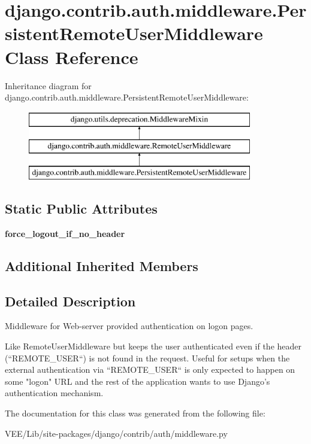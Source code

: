 \hypertarget{classdjango_1_1contrib_1_1auth_1_1middleware_1_1_persistent_remote_user_middleware}{}\section{django.\+contrib.\+auth.\+middleware.\+Persistent\+Remote\+User\+Middleware Class Reference}
\label{classdjango_1_1contrib_1_1auth_1_1middleware_1_1_persistent_remote_user_middleware}
Inheritance diagram for django.\+contrib.\+auth.\+middleware.\+Persistent\+Remote\+User\+Middleware\+:\begin{figure}[H]
\begin{center}
\leavevmode
\includegraphics[height=3.000000cm]{classdjango_1_1contrib_1_1auth_1_1middleware_1_1_persistent_remote_user_middleware}
\end{center}
\end{figure}
\subsection*{Static Public Attributes}
\begin{DoxyCompactItemize}
\item 
\mbox{\label{classdjango_1_1contrib_1_1auth_1_1middleware_1_1_persistent_remote_user_middleware_abdd37e2d6d902da3d4a43a937f27e431}} 
{\bfseries force\+\_\+logout\+\_\+if\+\_\+no\+\_\+header}
\end{DoxyCompactItemize}
\subsection*{Additional Inherited Members}


\subsection{Detailed Description}
\begin{DoxyVerb}Middleware for Web-server provided authentication on logon pages.

Like RemoteUserMiddleware but keeps the user authenticated even if
the header (``REMOTE_USER``) is not found in the request. Useful
for setups when the external authentication via ``REMOTE_USER``
is only expected to happen on some "logon" URL and the rest of
the application wants to use Django's authentication mechanism.
\end{DoxyVerb}
 

The documentation for this class was generated from the following file\+:\begin{DoxyCompactItemize}
\item 
V\+E\+E/\+Lib/site-\/packages/django/contrib/auth/middleware.\+py\end{DoxyCompactItemize}
